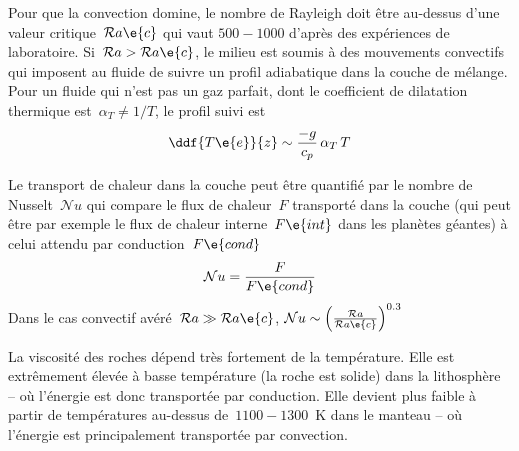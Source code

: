 \sk
Pour que la convection domine, le nombre de Rayleigh doit être au-dessus d'une valeur critique~$\mathcal{R}a\e{c}$ qui vaut $500-1000$ d'après des expériences de laboratoire. Si~$\mathcal{R}a > \mathcal{R}a\e{c}$, le milieu est soumis à des mouvements convectifs qui imposent au fluide de suivre un profil adiabatique dans la couche de mélange. Pour un fluide qui n'est pas un gaz parfait, dont le coefficient de dilatation thermique est~$\alpha_T \neq 1/T$, le profil suivi est
\[ \ddf{T\e{e}}{z} \sim \frac{-g}{c_p} \, \alpha_T \, T \]

\sk
Le transport de chaleur dans la couche peut être quantifié par le nombre de Nusselt~$\mathcal{N}u$ qui compare le flux de chaleur~$F$ transporté dans la couche (qui peut être par exemple le flux de chaleur interne~$F\e{int}$ dans les planètes géantes) à celui attendu par conduction~$F\e{cond}$
\[ \mathcal{N}u = \frac{F}{F\e{cond}} \]
\noindent Dans le cas convectif avéré~$\mathcal{R}a \gg \mathcal{R}a\e{c}$, $\mathcal{N}u \sim \left( \frac{\mathcal{R}a}{\mathcal{R}a\e{c}} \right)^{0.3}$

\sk
La viscosité des roches dépend très fortement de la température. Elle est extrêmement élevée à basse température (la roche est solide) dans la lithosphère -- où l'énergie est donc transportée par conduction. Elle devient plus faible à partir de températures au-dessus de~$1100-1300$~K dans le manteau -- où l'énergie est principalement transportée par convection.
